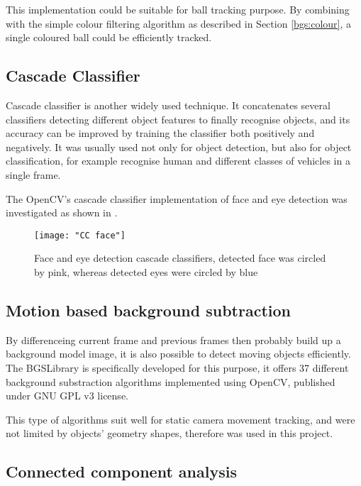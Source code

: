 This implementation could be suitable for ball tracking purpose. By combining with the simple colour filtering algorithm as described in Section \ref{bgs:colour}, a single coloured ball could be efficiently tracked.

\subsection{Cascade Classifier}

Cascade classifier \cite{cascade} is another widely used technique. It concatenates several classifiers detecting different object features to finally recognise objects, and its accuracy can be improved by training the classifier both positively and negatively. It was usually used not only for object detection, but also for object classification, for example recognise human and different classes of vehicles in a single frame.

The OpenCV's cascade classifier implementation \cite{opencv:cc} of face and eye detection was investigated as shown in .

\begin{figure}[H]
  \centering
  \texttt{[image: "CC face"]}
  \caption{Face and eye detection cascade classifiers, detected face was circled by pink, whereas detected eyes were circled by blue}
  \label{Figure:cc_face}
\end{figure}

\subsection{Motion based background subtraction}
\label{motion_bs}

By differenceing current frame and previous frames then probably build up a background model image, it is also possible to detect moving objects efficiently. The BGSLibrary \cite{bgslibrary} is specifically developed for this purpose, it offers 37 different background substraction algorithms implemented using OpenCV, published under GNU GPL v3 license.

This type of algorithms suit well for static camera movement tracking, and were not limited by objects' geometry shapes, therefore was used in this project.

\subsection{Connected component analysis}
\label{blob}

